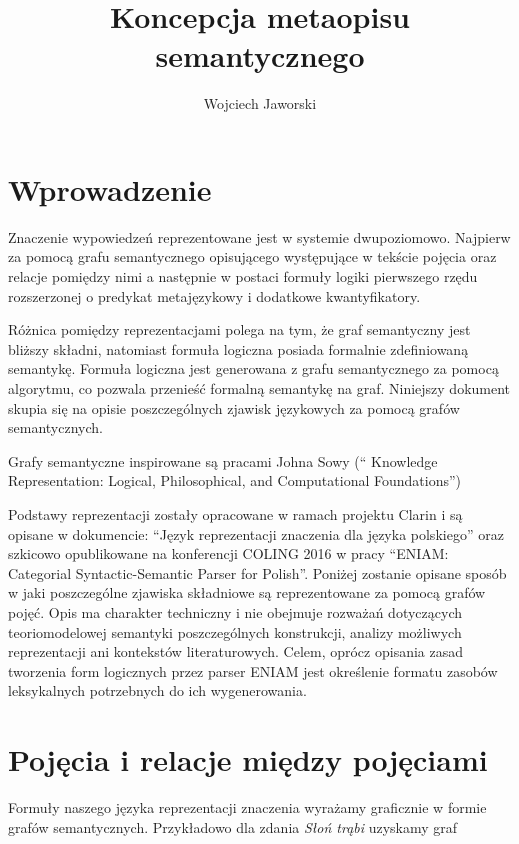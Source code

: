 \documentclass[a4paper,12pt]{article}
\title{Koncepcja metaopisu semantycznego}
\author{Wojciech Jaworski}
\date{}
\begin{document}
\maketitle

\section{Wprowadzenie}

Znaczenie wypowiedzeń reprezentowane jest w systemie dwupoziomowo.
Najpierw za pomocą grafu semantycznego opisującego występujące w tekście pojęcia
oraz relacje pomiędzy nimi a następnie w postaci formuły logiki pierwszego rzędu
rozszerzonej o predykat metajęzykowy i dodatkowe kwantyfikatory.

Różnica pomiędzy reprezentacjami polega na tym, że
graf semantyczny jest bliższy składni, natomiast formuła logiczna posiada formalnie zdefiniowaną semantykę.
Formuła logiczna jest generowana z grafu semantycznego za pomocą algorytmu, co pozwala przenieść
formalną semantykę na graf. Niniejszy dokument skupia się na opisie poszczególnych zjawisk językowych za pomocą grafów semantycznych.

Grafy semantyczne inspirowane są pracami Johna Sowy (`` Knowledge Representation:
Logical, Philosophical, and Computational Foundations'')

Podstawy reprezentacji zostały opracowane w ramach projektu Clarin i
są opisane w dokumencie: ``Język reprezentacji znaczenia dla języka
polskiego'' oraz szkicowo opublikowane na konferencji COLING 2016 w 
pracy ``ENIAM: Categorial Syntactic-Semantic Parser for Polish''.
Poniżej zostanie opisane sposób w jaki poszczególne zjawiska składniowe 
są reprezentowane za pomocą grafów pojęć. Opis ma charakter techniczny 
i nie obejmuje rozważań dotyczących teoriomodelowej semantyki poszczególnych konstrukcji, 
analizy możliwych reprezentacji ani kontekstów literaturowych. 
Celem, oprócz opisania zasad tworzenia form logicznych przez parser ENIAM
jest określenie formatu zasobów leksykalnych potrzebnych do ich wygenerowania.

\section{Pojęcia i relacje między pojęciami}
Formuły naszego języka reprezentacji znaczenia wyrażamy graficznie
w formie grafów semantycznych. %
Przykładowo dla zdania {\it Słoń trąbi} uzyskamy graf 
\end{document}
